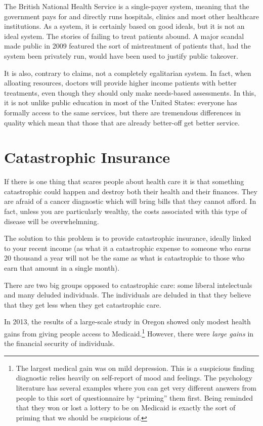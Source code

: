 The British National Health Service is a single-payer system, meaning that the
government pays for and directly runs hospitals, clinics and most other
healthcare institutions. As a system, it is certainly based on good ideals, but
it is not an ideal system. The stories of failing to treat patients abound. A
major scandal made public in 2009 featured the sort of mistreatment of patients
that, had the system been privately run, would have been used to justify public
takeover.

It is also, contrary to claims, not a completely egalitarian system. In fact,
when alloating resources, doctors will provide higher income patients with
better treatments, even though they should only make needs-based
assessments. In this, it is not
unlike public education in most of the United States: everyone has formally
access to the same services, but there are tremendous differences in quality
which mean that those that are already better-off get better service.

\section{Catastrophic Insurance}

If there is one thing that scares people about health care it is that something
catastrophic could happen and destroy both their health and their finances.
They are afraid of a cancer diagnostic which will bring bills that they cannot
afford. In fact, unless you are particularly wealthy, the costs associated with
this type of disease will be overwhelmning.

The solution to this problem is to provide catastrophic insurance, ideally
linked to your recent income (as what it a catastrophic expense to someone who
earns 20 thousand a year will not be the same as what is catastrophic to those
who earn that amount in a single month).

There are two big groups opposed to catastrophic care: some liberal
intelectuals and many deluded individuals. The individuals are deluded in that
they believe that they get less when they get catastrophic care.

In 2013, the results of a large-scale study in Oregon showed only modest health
gains from giving people access to Medicaid.\footnote{The largest medical gain
was on mild depression. This is a suspicious finding diagnostic relies heavily
on self-report of mood and feelings. The psychology literature has several
examples where you can get very different answers from people to this sort of
questionnaire by ``priming'' them first. Being reminded that they won or lost a
lottery to be on Medicaid is exactly the sort of priming that we should be
suspicious of.} However, there were \emph{large gains} in the financial
security of individuals.

